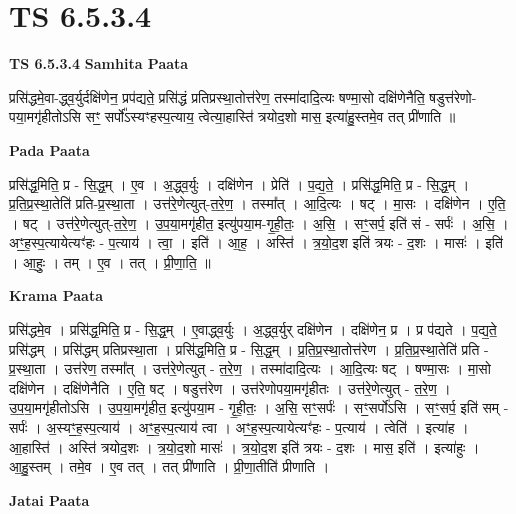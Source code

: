 \documentclass[17pt]{extarticle}
\begin{document}
\section{ TS 6.5.3.4 }

\textbf{TS 6.5.3.4 } \newline
\textbf{Samhita Paata} \newline

प्रसि॑द्धमे॒वा-द्ध्व॒र्युर्दक्षि॑णेन॒ प्रप॑द्यते॒ प्रसि॑द्धं प्रतिप्रस्था॒तोत्त॑रेण॒ तस्मा॑दादि॒त्यः षण्मा॒सो दक्षि॑णेनैति॒ षडुत्त॑रेणो-पया॒मगृ॑हीतोऽसि सꣳ॒॒ सर्पो᳚ऽस्यꣳहस्प॒त्याय॒ त्वेत्या॒हास्ति॑ त्रयोद॒शो मास॒ इत्या॑हु॒स्तमे॒व तत् प्री॑णाति ॥ \newline

\textbf{Pada Paata} \newline

प्रसि॑द्ध॒मिति॒ प्र - सि॒द्ध॒म् । ए॒व । अ॒द्ध्व॒र्युः । दक्षि॑णेन । प्रेति॑ । प॒द्य॒ते॒ । प्रसि॑द्ध॒मिति॒ प्र - सि॒द्ध॒म् । प्र॒ति॒प्र॒स्था॒तेति॑ प्रति-प्र॒स्था॒ता । उत्त॑रे॒णेत्युत्-त॒रे॒ण॒ । तस्मा᳚त् । आ॒दि॒त्यः । षट् । मा॒सः । दक्षि॑णेन । ए॒ति॒ । षट् । उत्त॑रे॒णेत्युत्-त॒रे॒ण॒ । उ॒प॒या॒मगृ॑हीत॒ इत्यु॑पया॒म-गृ॒ही॒तः॒ । अ॒सि॒ । सꣳ॒॒सर्प॒ इति॑ सं - सर्पः॑ । अ॒सि॒ । अꣳ॒॒ह॒स्प॒त्यायेत्यꣳ॑हः - प॒त्याय॑ । त्वा॒ । इति॑ । आ॒ह॒ । अस्ति॑ । त्र॒यो॒द॒श इति॑ त्रयः - द॒शः । मासः॑ । इति॑ । आ॒हुः॒ । तम् । ए॒व । तत् । प्री॒णा॒ति॒ ॥  \newline


\textbf{Krama Paata} \newline

प्रसि॑द्धमे॒व । प्रसि॑द्ध॒मिति॒ प्र - सि॒द्ध॒म् । ए॒वाद्ध्व॒र्युः । अ॒द्ध्व॒र्युर् दक्षि॑णेन । दक्षि॑णेन॒ प्र । प्र प॑द्यते । प॒द्य॒ते॒ प्रसि॑द्धम् । प्रसि॑द्धम् प्रतिप्रस्था॒ता । प्रसि॑द्ध॒मिति॒ प्र - सि॒द्ध॒म् । प्र॒ति॒प्र॒स्था॒तोत्त॑रेण । प्र॒ति॒प्र॒स्था॒तेति॑ प्रति - प्र॒स्था॒ता । उत्त॑रेण॒ तस्मा᳚त् । उत्त॑रे॒णेत्युत् - त॒रे॒ण॒ । तस्मा॑दादि॒त्यः । आ॒दि॒त्यः षट् । षण्मा॒सः । मा॒सो दक्षि॑णेन । दक्षि॑णेनैति । ए॒ति॒ षट् । षडुत्त॑रेण । उत्त॑रेणोपया॒मगृ॑हीतः । उत्त॑रे॒णेत्युत् - त॒रे॒ण॒ । उ॒प॒या॒मगृ॑हीतोऽसि । उ॒प॒या॒मगृ॑हीत॒ इत्यु॑पया॒म - गृ॒ही॒तः॒ । अ॒सि॒ सꣳ॒॒सर्पः॑ । सꣳ॒॒सर्पो॑ऽसि । सꣳ॒॒सर्प॒ इति॑ सम् - सर्पः॑ । अ॒स्यꣳ॒॒ह॒स्प॒त्याय॑ । अꣳ॒॒ह॒स्प॒त्याय॑ त्वा । अꣳ॒॒ह॒स्प॒त्यायेत्यꣳ॑हः - प॒त्याय॑ । त्वेति॑ । इत्या॑ह । आ॒हास्ति॑ । अस्ति॑ त्रयोद॒शः । त्र॒यो॒द॒शो मासः॑ । त्र॒यो॒द॒श इति॑ त्रयः - द॒शः । मास॒ इति॑ । इत्या॑हुः । आ॒हु॒स्तम् । तमे॒व । ए॒व तत् । तत् प्री॑णाति । प्री॒णा॒तीति॑ प्रीणाति । \newline

\textbf{Jatai Paata} \newline
\end{document}
